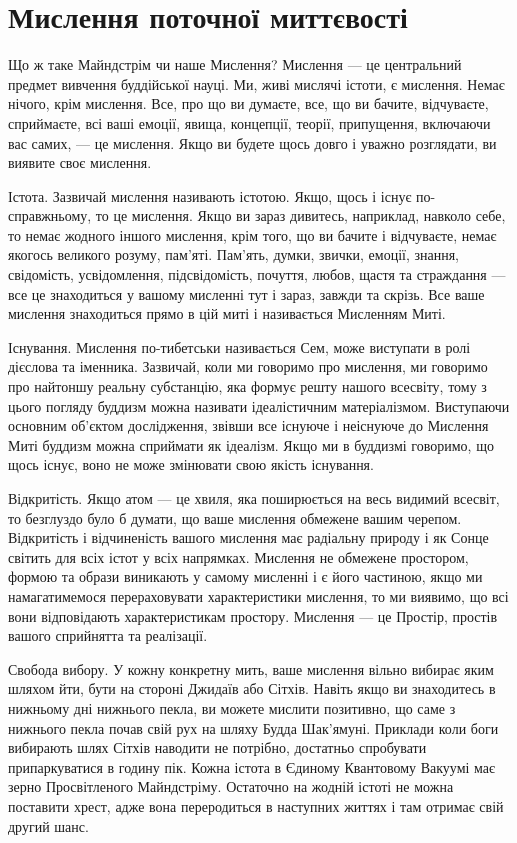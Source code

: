 \section{Мислення поточної миттєвості}

Що ж таке Майндстрім чи наше Мислення? Мислення --- це центральний предмет
вивчення буддійської науці. Ми, живі мислячі істоти, є мислення. Немає нічого,
крім мислення. Все, про що ви думаєте, все, що ви бачите, відчуваєте, сприймаєте,
всі ваші емоції, явища, концепції, теорії, припущення, включаючи вас самих, --- це мислення.
Якщо ви будете щось довго і уважно розглядати, ви виявите своє мислення.

Істота. Зазвичай мислення називають істотою. Якщо, щось і існує по-справжньому, то це мислення.
Якщо ви зараз дивитесь, наприклад, навколо себе, то немає жодного іншого мислення,
крім того, що ви бачите і відчуваєте, немає якогось великого розуму, пам'яті.
Пам'ять, думки, звички, емоції, знання, свідомість, усвідомлення, підсвідомість, почуття,
любов, щастя та страждання --- все це знаходиться у вашому мисленні тут і зараз, завжди та скрізь.
Все ваше мислення знаходиться прямо в цій миті і називається Мисленням Миті.

Існування. Мислення по-тибетськи називається Сем, може виступати в ролі дієслова
та іменника. Зазвичай, коли ми говоримо про мислення, ми говоримо про найтоншу
реальну субстанцію, яка формує решту нашого всесвіту, тому з цього погляду буддизм
можна називати ідеалістичним матеріалізмом. Виступаючи основним об'єктом дослідження,
звівши все існуюче і неіснуюче до Мислення Миті буддизм можна сприймати як ідеалізм.
Якщо ми в буддизмі говоримо, що щось існує, воно не може змінювати свою якість існування.

Відкритість. Якщо атом --- це хвиля, яка поширюється на весь видимий всесвіт,
то безглуздо було б думати, що ваше мислення обмежене вашим черепом. Відкритість і відчиненість
вашого мислення має радіальну природу і як Сонце світить для всіх істот у всіх напрямках.
Мислення не обмежене простором, формою та образи виникають у самому мисленні і є його частиною,
якщо ми намагатимемося перераховувати характеристики мислення, то ми виявимо, що всі вони
відповідають характеристикам простору. Мислення --- це Простір, простів вашого сприйнятта та реалізації.

Свобода вибору. У кожну конкретну мить, ваше мислення вільно вибирає яким шляхом йти,
бути на стороні Джидаїв або Сітхів. Навіть якщо ви знаходитесь в нижньому дні
нижнього пекла, ви можете мислити позитивно, що саме з нижнього пекла почав свій рух
на шляху Будда Шак'ямуні. Приклади коли боги вибирають шлях Сітхів наводити не потрібно,
достатньо спробувати припаркуватися в годину пік. Кожна істота в Єдиному Квантовому
Вакуумі має зерно Просвітленого Майндстріму. Остаточно на жодній істоті не можна поставити хрест,
адже вона переродиться в наступних життях і там отримає свій другий шанс.

